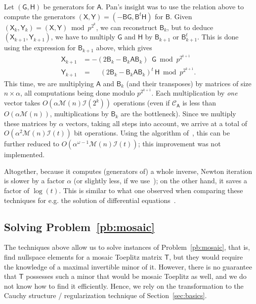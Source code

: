 \documentclass[sigconf]{acmart}
\newcommand{\mA}{\ensuremath{\mathsf{A}}}
\newcommand{\mB}{\ensuremath{\mathsf{B}}}
\newcommand{\mG}{\ensuremath{\mathsf{G}}}
\newcommand{\mH}{\ensuremath{\mathsf{H}}}
\newcommand{\mT}{\ensuremath{\mathsf{T}}}
\newcommand{\mX}{\ensuremath{\mathsf{X}}}
\newcommand{\mY}{\ensuremath{\mathsf{Y}}}
\newcommand{\M}{\ensuremath{\mathscr{M}}}
\newcommand{\I}{\ensuremath{\mathscr{I}}}
\newcommand{\CA}{\ensuremath{\mathscr{C}_\mA}}
\theoremstyle{acmdefinition}
\begin{document}
Let $(\mG,\mH)$ be generators for $\mA$. Pan's insight was to use the
relation above to compute the generators $(\mX,\mY)=(-\mB
\mG,\mB^{t}\mH)$ for $\mB$. Given $(\mX_k,\mY_k)=(\mX,\mY) \bmod
p^{2^k}$, we can reconstruct $\mB_k$, but to deduce
$(\mX_{k+1},\mY_{k+1})$, we have to multiply $\mG$ and $\mH$ by
$\mB_{k+1}$ or $\mB_{k+1}^t$. This is done using the expression for
$\mB_{k+1}$ above, which gives
\begin{align*}
\mX_{k+1} &= -(2\mB_k - \mB_k \mA \mB_k)\phantom{^t\,} \mG \bmod p^{2^{k+1}}\\
\mY_{k+1} &= \phantom{-}(2\mB_k - \mB_k \mA \mB_k)^t\, \mH \bmod p^{2^{k+1}}.
\end{align*}
This time, we are multiplying $\mA$ and $\mB_k$ (and their transposes)
by matrices of size $n \times \alpha$, all computations being done
modulo $p^{2^{k+1}}$. Each multiplication by {\em one} vector takes
$O(\alpha \M(n) \I(2^k))$ operations (even if $\CA$ is less
than $O(\alpha \M(n))$, multiplications by $\mB_k$ are the
bottleneck). Since we  multiply these matrices by $\alpha$
vectors, taking all steps into account, we arrive at a total of
$O(\alpha^2 \M(n) \I(t))$ bit operations. Using the algorithm
of~\cite{BoJeMoSc16}, this can be further reduced to
$O(\alpha^{\omega-1} \M(n) \I(t))$; this improvement was not
implemented.

Altogether, because it computes (generators of) a whole inverse,
Newton iteration is slower by a factor $\alpha$ (or slightly less, if
we use~\cite{BoJeMoSc16}); on the other hand, it saves a factor of
$\log(t)$. This is similar to what one observed when comparing these
techniques for e.g. the solution of differential
equations~\cite{BoChOlSaScSc07,BoChLeSaSc12}.


\vspace{-5px}
\subsection{Solving Problem~\ref{pb:mosaic}}

The techniques above allow us to solve instances of
Problem~\ref{pb:mosaic}, that is, find nullspace elements for a
mosaic Toeplitz matrix $\mT$, but they would require the knowledge of
a maximal invertible minor of it. However, there is no guarantee that
$\mT$ possesses such a minor that would be mosaic Toeplitz as well,
and we do not know how to find it efficiently. Hence, we rely on the
transformation to the Cauchy structure / regularization technique
of Section~\ref{sec:basics}.
\end{document}
